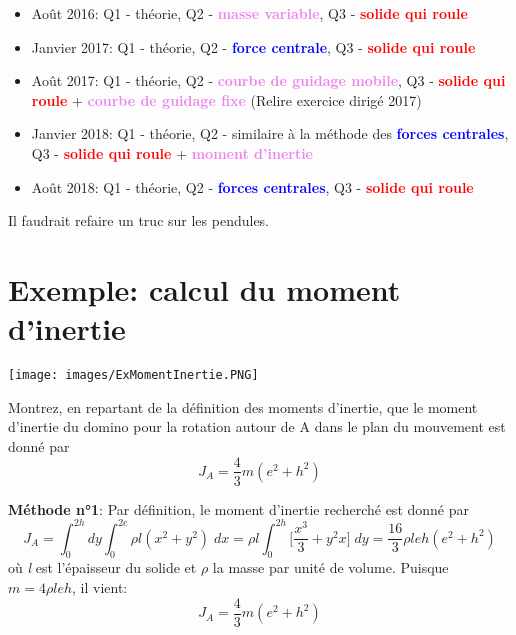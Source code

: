 \documentclass[a4paper]{article}
\begin{document}
\begin{itemize}
\item Août 2016: Q1 - théorie, Q2 - \textcolor{violet}{\textbf{masse variable}}, Q3 - \textcolor{red}{\textbf{solide qui roule}}

\item Janvier 2017: Q1 - théorie, Q2 - \textcolor{blue}{\textbf{force centrale}}, Q3 - \textcolor{red}{\textbf{solide qui roule}}

\item Août 2017: Q1 - théorie, Q2 - \textcolor{violet}{\textbf{courbe de guidage mobile}}, Q3 - \textcolor{red}{\textbf{solide qui roule}} + \textcolor{violet}{\textbf{courbe de guidage fixe}} (Relire exercice dirigé 2017)

\item Janvier 2018: Q1 - théorie, Q2 - similaire à la méthode des \textcolor{blue}{\textbf{forces centrales}}, Q3 - \textcolor{red}{\textbf{solide qui roule}} + \textcolor{violet}{\textbf{moment d'inertie}}

\item Août 2018: Q1 - théorie, Q2 - \textcolor{blue}{\textbf{forces centrales}}, Q3 - \textcolor{red}{\textbf{solide qui roule}}

\end{itemize}


Il faudrait refaire un truc sur les pendules.










\section{Exemple: calcul du moment d'inertie}





\begin{center} \texttt{[image: images/ExMomentInertie.PNG]} \end{center}

\begin{siderules} Montrez, en repartant de la définition des moments d’inertie, que le moment d’inertie du domino pour la rotation autour de A dans le plan du mouvement est donné par
\[ J_A = \frac{4}{3} m (e^2 + h^2) \] \end{siderules}


\textbf{Méthode n°1}: Par définition, le moment d’inertie recherché est donné par
\[ J_A = \int_0^{2h} d y \int_0^{2e} \rho l (x^2 + y^2) \; d x = \rho l \int_0^{2h} \bigg[ \frac{x^3}{3} + y^2 x \bigg] \; d y = \frac{16}{3} \rho l e h (e^2 + h^2) \]
où \emph{l} est l'épaisseur du solide et $ \rho $ la masse par unité de volume. Puisque $ m = 4 \rho l e h $, il vient: 
\[ J_A = \frac{4}{3} m (e^2 + h^2) \]
\end{document}
